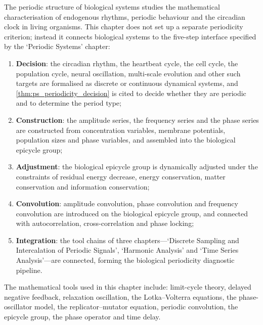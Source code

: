 \begin{remark}\label{rem:bio_five_steps_positioning}
The periodic structure of biological systems studies the mathematical characterisation of endogenous rhythms, periodic behaviour and the circadian clock in living organisms. This chapter does not set up a separate periodicity criterion; instead it connects biological systems to the five-step interface specified by the `Periodic Systems' chapter:
\begin{enumerate}[label=(\arabic*)]
    \item \textbf{Decision}: the circadian rhythm, the heartbeat cycle, the cell cycle, the population cycle, neural oscillation, multi-scale evolution and other such targets are formalised as discrete or continuous dynamical systems, and \cref{thm:ps_periodicity_decision} is cited to decide whether they are periodic and to determine the period type;
    \item \textbf{Construction}: the amplitude series, the frequency series and the phase series are constructed from concentration variables, membrane potentials, population sizes and phase variables, and assembled into the biological epicycle group;
    \item \textbf{Adjustment}: the biological epicycle group is dynamically adjusted under the constraints of residual energy decrease, energy conservation, matter conservation and information conservation;
    \item \textbf{Convolution}: amplitude convolution, phase convolution and frequency convolution are introduced on the biological epicycle group, and connected with autocorrelation, cross-correlation and phase locking;
    \item \textbf{Integration}: the tool chains of three chapters---`Discrete Sampling and Intercalation of Periodic Signals', `Harmonic Analysis' and `Time Series Analysis'---are connected, forming the biological periodicity diagnostic pipeline.
\end{enumerate}
The mathematical tools used in this chapter include: limit-cycle theory, delayed negative feedback, relaxation oscillation, the Lotka--Volterra equations, the phase-oscillator model, the replicator--mutator equation, periodic convolution, the epicycle group, the phase operator and time delay.
\end{remark}

